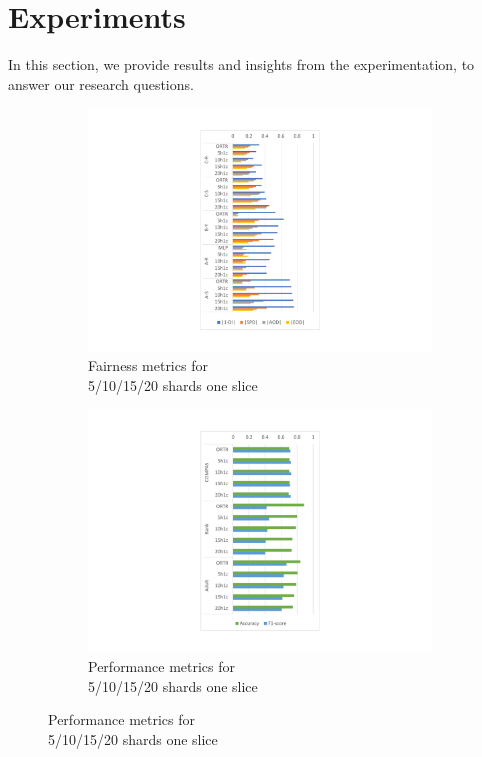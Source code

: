 

\section{Experiments}
\label{sec:experiment}


In this section, we provide results and insights from the experimentation, to answer our research questions.





\begin{figure}[t!]
  \centering
   \begin{subfigure}[b]{0.24\textwidth}
         \centering
         \includegraphics[width=\textwidth]{assets/rq1-fairness-1slice-vertical.pdf}
         \caption{Fairness metrics for \\ 5/10/15/20 shards one slice
         }
         \label{fig:rq1-fairness-1slice}
 \end{subfigure}
    \begin{subfigure}[b]{0.24\textwidth}
         \centering
         \includegraphics[width=\textwidth]{assets/rq1-performance-1slice-vertical.pdf}
         \caption{Performance metrics for \\ 5/10/15/20 shards one slice}
         \label{fig:rq1-performance-1slice}
 \end{subfigure}




\end{figure}
